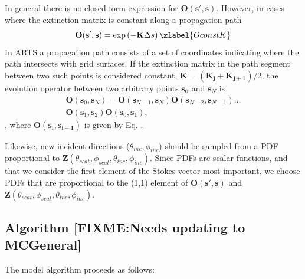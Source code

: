 In general there is no closed form expression for $\mathbf{O(s',s)}$.
However, in cases where the extinction matrix is constant along a
propagation path
\begin{equation}
\mathbf{O(s',s)}=\exp\left(-\mathbf{K}\Delta s\right)
\zlabel{OconstK}
\end{equation}
In ARTS a propagation path consists of a set of coordinates
indicating where the path intersects with grid surfaces.  If the
extinction matrix in the path segment between two such points is
considered constant, $\mathbf{K}=(\mathbf{K_j}+\mathbf{K_{j+1}})/2$,
the evolution operator between two arbitrary points $\mathbf{s_0}$ and
$\mathbf{s}_N$ is
\begin{eqnarray}
\mathbf{O}(\mathbf{s}_0,\mathbf{s}_N) =
\mathbf{O}(\mathbf{s}_{N-1},\mathbf{s}_N)
\mathbf{O}(\mathbf{s}_{N-2},\mathbf{s}_{N-1}) \dots \nonumber\\
\mathbf{O}(\mathbf{s}_1,\mathbf{s}_2)\mathbf{O}(\mathbf{s}_0,\mathbf{s}_1),
\end{eqnarray}
, where $\mathbf{O(s_i,s_{i+1})}$ is given by Eq. .




Likewise, new incident directions
($\theta_{inc},\phi_{inc}$) should be sampled from a PDF proportional
to
$\mathbf{Z}(\theta_{scat},\phi_{scat},\theta_{inc},\phi_{inc})$.
Since PDFs are scalar functions, and that we consider the first element of the
Stokes vector most important, we choose PDFs that are proportional to the
(1,1) element of $\mathbf{O(s',s)}$ and $\mathbf{Z}(\theta_{scat},\phi_{scat},\theta_{inc},\phi_{inc})$. 
\subsection{Algorithm [FIXME:Needs updating to MCGeneral]}
The model algorithm proceeds as follows:


